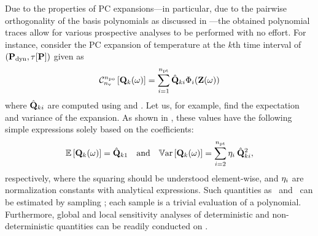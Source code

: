 Due to the properties of PC expansions---in particular, due to the pairwise orthogonality of the basis polynomials as discussed in ---the obtained polynomial traces allow for various prospective analyses to be performed with no effort. For instance, consider the PC expansion of temperature at the $k$th time interval of $\profilePdyn$ given as
\begin{equation} \elabel{pc-k}
  \oPC{\nvars}{\pcorder}{\vTO_k(\o)} = \sum_{i = 1}^{\pcterms} \pcc{\vTO}_{ki} \pcb_i(\vZ(\o))
\end{equation}
where $\hat{\mathbf{Q}}_{ki}$ are computed using  and . Let us, for example, find the expectation and variance of the expansion. As shown in , these values have the following simple expressions solely based on the coefficients:
\begin{equation} \elabel{pc-moments}
  \oExp{\vTO_k(\o)} = \pcc{\vTO}_{k1} \hspace{1em} \text{and} \hspace{1em} \oVar{\vTO_k(\o)} = \sum_{i = 2}^{\pcterms} \pcn_i \: \pcc{\vTO}_{ki}^2,
\end{equation}
respectively, where the squaring should be understood element-wise, and $\eta_i$ are normalization constants with analytical expressions. Such quantities as \cdfs\ and \pdfs\ can be estimated by sampling ; each sample is a trivial evaluation of a polynomial. Furthermore, global and local sensitivity analyses of deterministic and non-deterministic quantities can be readily conducted on .
